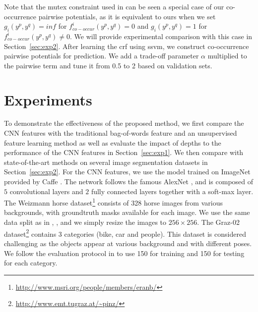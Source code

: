 \documentclass[10pt,3p]{elsarticle}
\newcommand{\ssvm}{{\sc ssvm}\xspace}
\newcommand{\crf}{{\sc crf}\xspace}
\begin{document}
Note that the mutex constraint used in \cite{Roy14} can be seen a special case of our co-occurrence pairwise potentials, as it is equivalent to ours when we set $g_i(y^p, y^q)=inf$  for  $f^i_{co-occur}(y^p, y^q)=0$ and $g_i(y^p, y^q)=1$  for  $f^i_{co-occur}(y^p, y^q) \neq 0$.
We will provide experimental comparison with this case in Section~\ref{sec:exp2}.
After learning the \crf using \ssvm, we construct co-occurrence pairwise potentials for prediction.
We add a trade-off parameter $\alpha$ multiplied to the pairwise term and tune it from 0.5 to 2 based on validation sets.






\section{Experiments}
To demonstrate the effectiveness of the proposed method, we first compare the CNN features with the traditional bag-of-words feature and an unsupervised feature learning method \cite{Coates11} as well as evaluate the impact of depths to the performance of the CNN features in Section~\ref{sec:exp1}.
We then compare with state-of-the-art methods on several image segmentation datasets in Section~\ref{sec:exp2}.
For the CNN features, we use the model trained on ImageNet provided by Caffe \cite{Jia13caffe}.
The network follows the famous AlexNet \cite{deepCNN12}, and is composed of $5$ convolutional layers and $2$ fully connected layers together with a soft-max layer.
The Weizmann horse dataset\footnote{\url{ http://www.msri.org/people/members/eranb/} }  consists of 328 horse images from various backgrounds, with groundtruth masks available for each image. We use the same data split as in \cite{Bertelli11}, \cite{Kuettel12}, and we simply resize the images to $256 \times 256$.
The Graz-02
dataset\footnote{\url{http://www.emt.tugraz.at/~pinz/} } contains 3 categories (bike, car and people). 
This dataset is considered challenging as the objects appear at various background and with different poses.  
We follow the evaluation protocol in \cite{Marszalek07} to use 150 for training and 150 for testing for each category.
\end{document}
